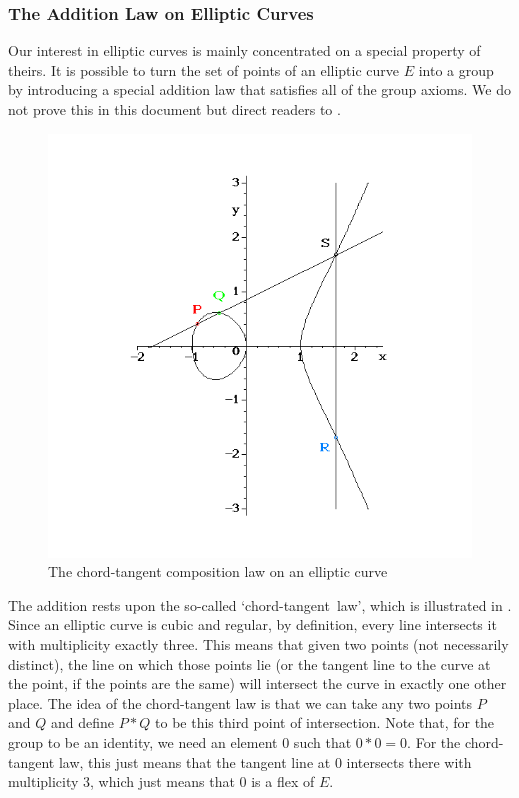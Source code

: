 \subsubsection{The Addition Law on Elliptic Curves}
Our interest in elliptic curves is mainly concentrated on a special property of theirs.
It is possible to turn the set of points of an elliptic curve $E$ into a group by introducing a special addition law that satisfies all of the group axioms.
We do not prove this in this document but direct readers to \cite{silverman2009}.
\begin{figure}[htbp]
	\centering
	\includegraphics[scale=0.5]{../Figures/addition.png}
	\caption{The chord-tangent composition law on an elliptic curve}
	\label{chord-tangent}
\end{figure}
The addition rests upon the so-called `chord-tangent~law', which is illustrated in .
Since an elliptic curve is cubic and regular, by definition, every line intersects it with multiplicity exactly three.
This means that given two points (not necessarily distinct), the line on which those points lie (or the tangent line to the curve at the point, if the points are the same) will intersect the curve in exactly one other place.
The idea of the chord-tangent law is that we can take any two points $P$ and $Q$ and define $P * Q$ to be this third point of intersection.
Note that, for the group to be an identity, we need an element $0$ such that $0 * 0 = 0$.
For the chord-tangent law, this just means that the tangent line at $0$ intersects there with multiplicity 3, which just means that $0$ is a flex of $E$.

